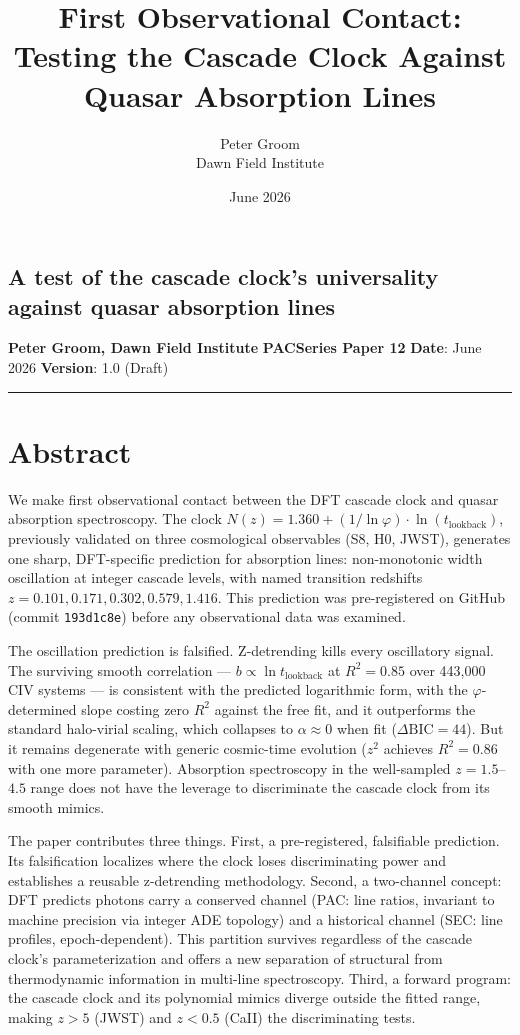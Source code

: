 \documentclass[11pt,a4paper]{article}
\title{First Observational Contact: Testing the Cascade Clock Against Quasar Absorption Lines}
\author{Peter Groom \\ Dawn Field Institute}
\date{June 2026}
\begin{document}
\maketitle

\subsection*{A test of the cascade clock's universality against quasar absorption lines}

\textbf{Peter Groom, Dawn Field Institute} \textbf{PACSeries Paper 12} \textbf{Date}: June 2026 \textbf{Version}: 1.0 (Draft)

\begin{center}\rule{0.5\linewidth}{0.4pt}\end{center}

\section*{Abstract}

We make first observational contact between the DFT cascade clock and quasar absorption spectroscopy. The clock $N(z) = 1.360 + (1/\ln\varphi) \cdot \ln(t_\text{lookback})$, previously validated on three cosmological observables (S8, H0, JWST), generates one sharp, DFT-specific prediction for absorption lines: non-monotonic width oscillation at integer cascade levels, with named transition redshifts $z = 0.101, 0.171, 0.302, 0.579, 1.416$. This prediction was pre-registered on GitHub (commit \texttt{193d1c8e}) before any observational data was examined.

The oscillation prediction is falsified. Z-detrending kills every oscillatory signal. The surviving smooth correlation — $b \propto \ln t_\text{lookback}$ at $R^2 = 0.85$ over 443,000 CIV systems — is consistent with the predicted logarithmic form, with the $\varphi$-determined slope costing zero $R^2$ against the free fit, and it outperforms the standard halo-virial scaling, which collapses to $\alpha \approx 0$ when fit ($\Delta\text{BIC} = 44$). But it remains degenerate with generic cosmic-time evolution ($z^2$ achieves $R^2 = 0.86$ with one more parameter). Absorption spectroscopy in the well-sampled $z = 1.5$–$4.5$ range does not have the leverage to discriminate the cascade clock from its smooth mimics.

The paper contributes three things. First, a pre-registered, falsifiable prediction. Its falsification localizes where the clock loses discriminating power and establishes a reusable z-detrending methodology. Second, a two-channel concept: DFT predicts photons carry a conserved channel (PAC: line ratios, invariant to machine precision via integer ADE topology) and a historical channel (SEC: line profiles, epoch-dependent). This partition survives regardless of the cascade clock's parameterization and offers a new separation of structural from thermodynamic information in multi-line spectroscopy. Third, a forward program: the cascade clock and its polynomial mimics diverge outside the fitted range, making $z > 5$ (JWST) and $z < 0.5$ (CaII) the discriminating tests.
\end{document}
